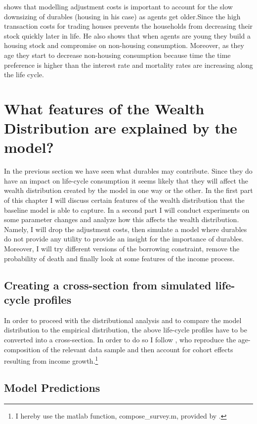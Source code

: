 \documentclass[a4paper,12pt,legno]{article}
\begin{document}
\cite{yang2009} shows that modelling adjustment costs is important to account for the slow downsizing of durables (housing in his case) as agents get older.Since the high transaction costs for trading houses prevents the households from decreasing their stock quickly later in life. He also shows that when agents are young they build a housing stock and compromise on non-housing consumption. Moreover, as they age they start to decrease non-housing consumption because  time the time preference is higher than the interest rate and mortality rates are increasing along the life cycle. 


\label{Chapter4}


\section{What features of the Wealth Distribution are explained by the model?}
\label{Chapter5}
In the previous section we have seen what durables may contribute. Since they do have an impact on life-cycle consumption it seems likely that they will affect the wealth distribution created by the model in one way or the other. 
In the first part of this chapter I will discuss certain features of the wealth distribution that the baseline model is able to capture. In a second part I will conduct experiments on some parameter changes and analyze how this affects the wealth distribution. Namely, I will drop the adjustment costs, then simulate a model where durables do not provide any utility to provide an insight for the importance of durables. Moreover, I will try different versions of the borrowing constraint, remove the probability of death and finally look at some features of the income process. 

\subsection{Creating a cross-section from simulated life-cycle profiles}
In order to proceed with the distributional analysis and to compare the model distribution to the empirical distribution, the above life-cycle profiles have to be converted into a cross-section. In order to do so I follow \cite{hintermaier2011}, who reproduce the age-composition of the relevant data sample and then account for cohort effects resulting from income growth.\footnote{I hereby use the matlab function, compose\_survey.m, provided by \cite{hintermaier2016}.}

\subsection{Model Predictions}
\end{document}
